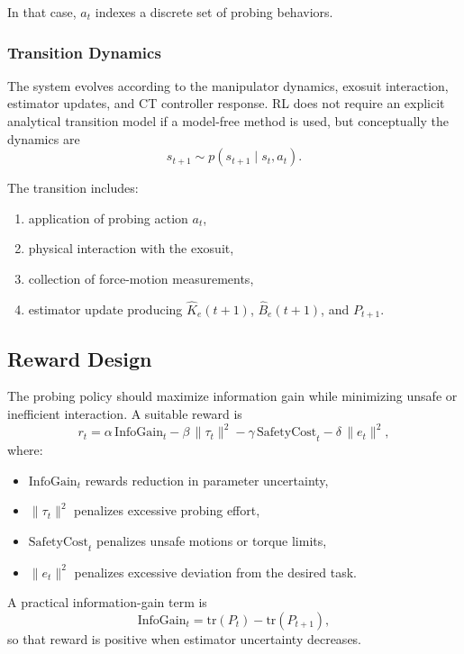 \documentclass[11pt]{article}
\begin{document}
In that case, \(a_t\) indexes a discrete set of probing behaviors.

\subsubsection{Transition Dynamics}

The system evolves according to the manipulator dynamics, exosuit interaction, estimator updates, and CT controller response. RL does not require an explicit analytical transition model if a model-free method is used, but conceptually the dynamics are
\begin{equation}
s_{t+1} \sim p(s_{t+1}\mid s_t,a_t).
\end{equation}

The transition includes:
\begin{enumerate}
    \item application of probing action \(a_t\),
    \item physical interaction with the exosuit,
    \item collection of force-motion measurements,
    \item estimator update producing \(\hat{K}_e(t+1)\), \(\hat{B}_e(t+1)\), and \(P_{t+1}\).
\end{enumerate}

\subsection{Reward Design}

The probing policy should maximize information gain while minimizing unsafe or inefficient interaction. A suitable reward is
\begin{equation}
r_t =
\alpha\,\mathrm{InfoGain}_t
-\beta\,\|\tau_t\|^2
-\gamma\,\mathrm{SafetyCost}_t
-\delta\,\|e_t\|^2,
\label{eq:rl_reward_general}
\end{equation}
where:
\begin{itemize}
    \item \(\mathrm{InfoGain}_t\) rewards reduction in parameter uncertainty,
    \item \(\|\tau_t\|^2\) penalizes excessive probing effort,
    \item \(\mathrm{SafetyCost}_t\) penalizes unsafe motions or torque limits,
    \item \(\|e_t\|^2\) penalizes excessive deviation from the desired task.
\end{itemize}

A practical information-gain term is
\begin{equation}
\mathrm{InfoGain}_t = \mathrm{tr}(P_t)-\mathrm{tr}(P_{t+1}),
\label{eq:infogain_trace}
\end{equation}
so that reward is positive when estimator uncertainty decreases.
\end{document}
